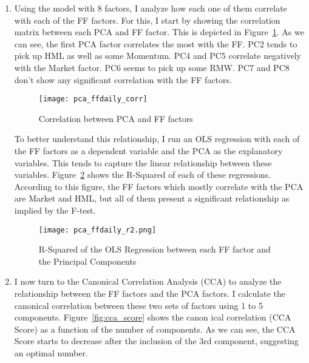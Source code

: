 \begin{solution}
\begin{enumerate}[label = \Alph*)]
        \item Using the model with 8 factors, I analyze how each one of them correlate with each of the FF factors. For this, I start by showing the correlation matrix between each PCA and FF factor. This is depicted in Figure~\ref{fig:pca_ffdaily_corr}. As we can see, the first PCA factor correlates the most with the FF. PC2 tends to pick up HML as well as some Momentum.  PC4 and PC5 correlate negatively with the Market factor. PC6 seems to pick up some RMW. PC7 and PC8 don't show any significant correlation with the FF factors.
        
        \begin{figure}[!htbp]
            \begin{small}
                \begin{center}
                    \texttt{[image: pca\_ffdaily\_corr]}
                \end{center}
                \caption{Correlation between PCA and FF factors}
                \label{fig:pca_ffdaily_corr}
            \end{small}
        \end{figure}
        
        To better understand this relationship, I run an OLS regression with each of the FF factors as a dependent variable and the PCA as the explanatory variables. This tends to capture the linear relationship between these variables. Figure~\ref{fig:pca_ffdaily_r2} shows the R-Squared of each of these regressions. According to this figure, the FF factors which mostly correlate with the PCA are Market and HML, but all of them present a significant relationship as implied by the F-test.

        \begin{figure}[!htbp]
            \begin{small}
                \begin{center}
                    \texttt{[image: pca\_ffdaily\_r2.png]}
                \end{center}
                \caption{R-Squared of the OLS Regression between each FF factor and the Principal Components}
                \label{fig:pca_ffdaily_r2}
            \end{small}
        \end{figure}
        
        \item I now turn to the Canonical Correlation Analysis (CCA) to analyze the relationship between the FF factors and the PCA factors. I calculate the canonical correlation between these two sets of factors using 1 to 5 components. Figure~\ref{fig:cca_score} shows the canon
        ical correlation (CCA Score) as a function of the number of components. As we can see, the CCA Score starts to decrease after the inclusion of the 3rd component, suggesting an optimal number.
        

\end{enumerate}
\end{solution}
